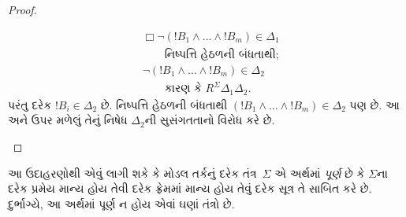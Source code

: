 \documentclass[../../../include/open-logic-section]{subfiles}
\begin{document}
\begin{proof}
\begin{enumerate}
\begin{align*}
      & \Box\lnot (!B_1 \land \dots \land !B_m) \in \Delta_1\\
      &\qquad\text{નિષ્પત્તિ હેઠળની બંધતાથી}; \\
      & \lnot (!B_1 \land \dots \land !B_m) \in \Delta_2\\
      &\qquad \text{કારણ કે }
      R^\Sigma \Delta_1\Delta_2.
    \end{align*}
    પરંતુ દરેક $!B_i \in \Delta_2$ છે. નિષ્પત્તિ હેઠળની બંધતાથી
    $(!B_1 \land \dots \land !B_m) \in \Delta_2$ પણ છે.
    આ અને ઉપર મળેલું તેનું નિષેધ $\Delta_2$ની સુસંગતતાનો
    વિરોધ કરે છે.
  \end{enumerate}
\end{proof}



આ ઉદાહરણોથી એવું લાગી શકે કે મોડલ તર્કનું દરેક તંત્ર~$\Sigma$
એ અર્થમાં \emph{પૂર્ણ} છે કે $\Sigma$ના દરેક પ્રમેય માન્ય હોય તેવી
દરેક ફ્રેમમાં માન્ય હોય તેવું દરેક સૂત્ર તે સાબિત કરે છે.
દુર્ભાગ્યે, આ અર્થમાં પૂર્ણ ન હોય એવાં ઘણાં તંત્રો છે.
\end{document}
